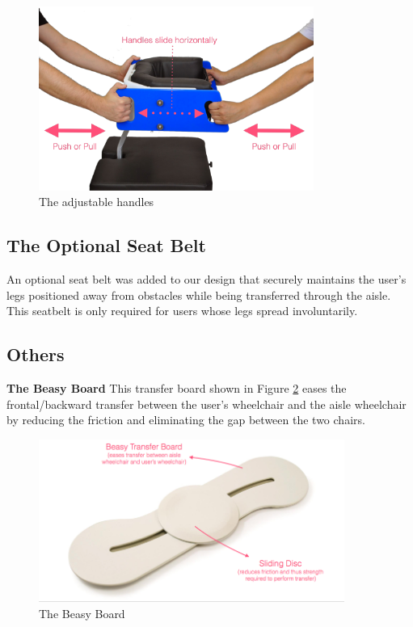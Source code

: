 \begin{figure}[h]
\centering
\includegraphics[width=9cm]{images/AisleWheelchair7.png}
\caption{The adjustable handles}
\label{fig:handles}
\end{figure}

\subsection{The Optional Seat Belt}
An optional seat belt was added to our design that securely maintains the user's legs positioned away from obstacles while being transferred through the aisle. This seatbelt is only required for users whose legs spread involuntarily.

\subsection{Others}
\textbf{The Beasy Board}
	This transfer board shown in Figure  \ref{fig:board} eases the frontal/backward transfer between the user's wheelchair and the aisle wheelchair by reducing the friction and eliminating the gap between the two chairs.

\begin{figure}[h]
\centering
\includegraphics[width=10cm]{images/AisleWheelchair8.png}
\caption{The Beasy Board}
\label{fig:board}
\end{figure}

